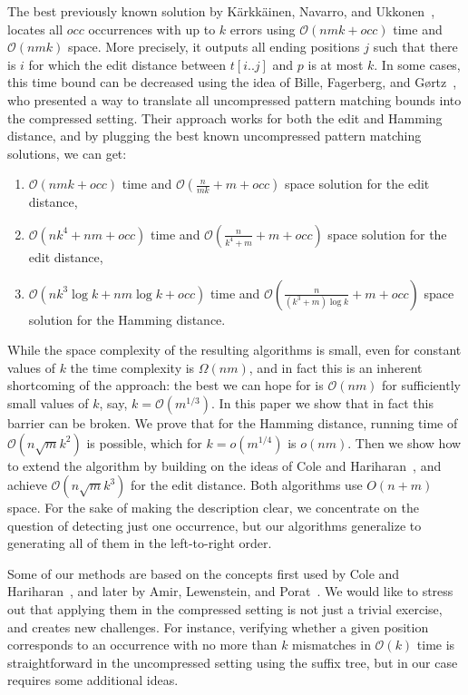 \documentclass[runningheads]{llncs}
\begin{document}
The best previously known solution by K{\"a}rkk{\"a}inen, Navarro, and Ukkonen~\cite{Juha}, locates all $occ$ occurrences with up to $k$ errors using $\mathcal{O}(nmk+occ)$ time and $\mathcal{O}(nmk)$ space. More precisely, it outputs all ending positions $j$ such that there is $i$ for which the edit distance between $t[i..j]$ and $p$ is at most $k$. In some cases, this time bound can be decreased using the idea of Bille, Fagerberg, and G{\o}rtz~\cite{Bille}, who presented a way to translate all uncompressed pattern matching bounds into the compressed setting. Their approach works for both the edit and Hamming distance, and by plugging the best known uncompressed pattern matching solutions, we can get:
\begin{enumerate}
\item $\mathcal{O}(nmk+occ)$ time and $\mathcal{O}(\frac{n}{mk}+m+occ)$ space solution for the edit distance,
\item $\mathcal{O}(nk^{4}+nm+occ)$ time and $\mathcal{O}(\frac{n}{k^{4}+m}+m+occ)$ space solution for the edit distance,
\item $\mathcal{O}(nk^{3}\log k+nm\log k+occ)$ time and $\mathcal{O}(\frac{n}{(k^{3}+m)\log k}+m+occ)$ space solution for the Hamming distance.
\end{enumerate}
While the space complexity of the resulting algorithms is small, even for constant values of $k$ the time complexity is $\Omega(nm)$, and in fact this is an inherent shortcoming of the approach: the best we can hope for is $\mathcal{O}(nm)$ for sufficiently small values of $k$, say, $k=\mathcal{O}(m^{1/3})$. In this paper we show that in fact this barrier can be broken. We prove that for the Hamming distance, running time of $\mathcal{O}(n\sqrt{m}k^{2})$ is possible, which for $k=o(m^{1/4})$ is $o(nm)$. Then we show how to extend the algorithm by building on the ideas of Cole and Hariharan~\cite{ColeHariharan}, and achieve $\mathcal{O}(n\sqrt{m}k^{3})$ for the edit distance. Both algorithms use $O(n+m)$ space. For the sake of making the description clear, we concentrate on the question of detecting just one occurrence, but our algorithms generalize to generating all of them in the left-to-right order.


Some of our methods are based on the concepts first used by Cole and Hariharan~\cite{ColeHariharan}, and later by Amir, Lewenstein, and Porat~\cite{AmirMismatches}. We would like to
stress out that applying them in the compressed setting is not just a trivial exercise, and creates new challenges. For instance, verifying whether a given position corresponds
to an occurrence with no more than $k$ mismatches in $\mathcal{O}(k)$ time is straightforward in the uncompressed setting using the suffix tree, but in our case requires some additional ideas.
\end{document}
